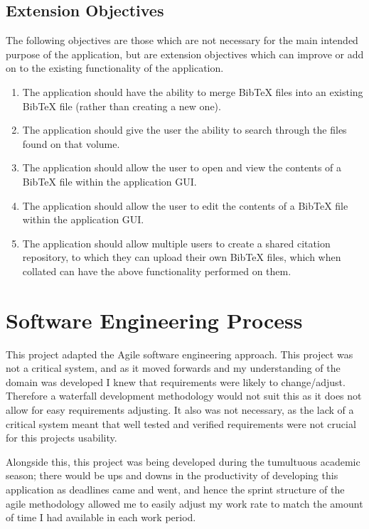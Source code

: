 \documentclass[a4paper,11pt]{article}
\begin{document}
\subsection{Extension Objectives}
The following objectives are those which are not necessary for the main intended purpose of the application, but are extension objectives which can improve or add on to the existing functionality of the application.
\begin{enumerate}
    \item The application should have the ability to merge BibTeX files into an existing BibTeX file (rather than creating a new one).
    \item The application should give the user the ability to search through the files found on that volume.
    \item The application should allow the user to open and view the contents of a BibTeX file within the application GUI.
    \item The application should allow the user to edit the contents of a BibTeX file within the application GUI.
    \item The application should allow multiple users to create a shared citation repository, to which they can upload their own BibTeX files, which when collated can have the above functionality performed on them.
\end{enumerate}

\section{Software Engineering Process}
This project adapted the Agile software engineering approach. This project was not a critical system, and as it moved forwards and my understanding of the domain was developed I knew that requirements were likely to change/adjust. Therefore a waterfall development methodology would not suit this as it does not allow for easy requirements adjusting. It also was not necessary, as the lack of a critical system meant that well tested and verified requirements were not crucial for this projects usability. 

Alongside this, this project was being developed during the tumultuous academic season; there would be ups and downs in the productivity of developing this application as deadlines came and went, and hence the sprint structure of the agile methodology allowed me to easily adjust my work rate to match the amount of time I had available in each work period.
\end{document}
